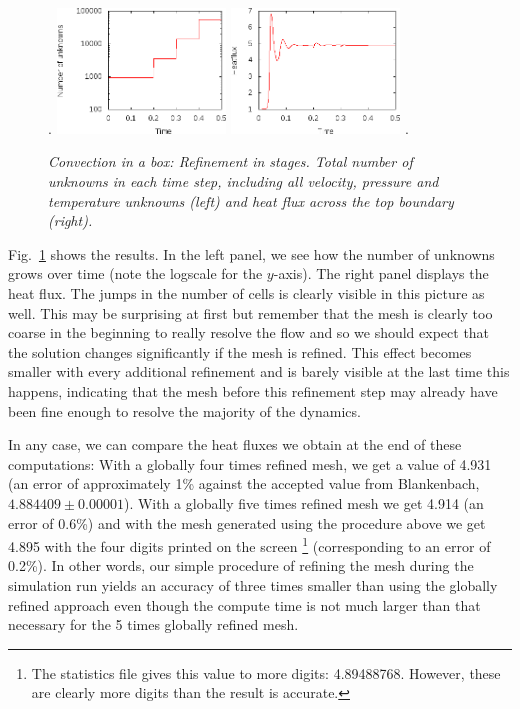 \documentclass{article}
\begin{document}
\begin{figure}
\phantom.
\hfill
\includegraphics[width=0.4\textwidth]{cookbooks/convection-box/steps_unknowns}
\hfill
\includegraphics[width=0.4\textwidth]{cookbooks/convection-box/steps_heatflux}
\hfill
\phantom.
\caption{\it Convection in a box: Refinement in stages. Total number
of unknowns in each time step, including all velocity, pressure and
temperature unknowns (left) and heat flux across the top boundary (right).}
\label{fig:convection-box-stats-steps}
\end{figure}


Fig.~\ref{fig:convection-box-stats-steps} shows the results. In the left panel,
we see how the number of unknowns grows over time (note the logscale for the
$y$-axis). The right panel displays the heat flux. The jumps in the number of
cells is clearly visible in this picture as well. This may be surprising at
first but remember that the mesh is clearly too coarse in the beginning to
really resolve the flow and so we should expect that the solution changes
significantly if the mesh is refined. This effect becomes smaller with every
additional refinement and is barely visible at the last time this happens,
indicating that the mesh before this refinement step may already have been fine
enough to resolve the majority of the dynamics.

In any case, we can compare the heat fluxes we obtain at the end of these
computations: With a globally four times refined mesh, we get a value of 4.931
(an error of approximately 1\% against the accepted value from Blankenbach,
$4.884409\pm 0.00001$). With a globally five times refined mesh we get 4.914 (an
error of 0.6\%) and with the mesh generated using the procedure above we get
4.895 with the four digits printed on the screen%
\footnote{The statistics file gives this
value to more digits: 4.89488768. However, these are clearly more digits than
the result is accurate.}
(corresponding to an error of 0.2\%). In other words, our
simple procedure of refining the mesh during the simulation run yields an
accuracy of three times smaller than using the globally refined approach even
though the compute time is not much larger than that necessary for the 5 times
globally refined mesh.
\end{document}
